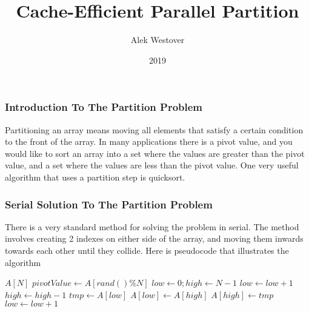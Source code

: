 \documentclass{beamer}
\title{Cache-Efficient Parallel Partition}
\author{Alek Westover}
\institute{MIT PRIMES}
\date{2019}
\begin{document}
 
\frame{\titlepage}
 
\begin{frame}
\frametitle{Introduction To The Partition Problem}
Partitioning an array means moving all elements that satisfy a certain condition to the front of the array. In many applications there is a pivot value, and you would like to sort an array into a set where the values are greater than the pivot value, and a set where the values are less than the pivot value. One very useful algorithm that uses a partition step is quicksort. 
\end{frame}

\begin{frame}
\frametitle{Serial Solution To The Partition Problem}
There is a very standard method for solving the problem in serial. The method involves creating 2 indexes on either side of the array, and moving them inwards towards each other until they collide. Here is pseudocode that illustrates the algorithm
\end{frame}

\begin{frame} 
\begin{algorithmic}
	\State $A[N]$ 
	\State $pivotValue \gets A[rand()\%N]$
	\State $low \gets 0; high  \gets N-1$
			\State $low \gets low+1$
		\EndWhile
			\State $high \gets high-1$
		\EndWhile
		\State $tmp \gets A[low]$
		\State $A[low] \gets A[high]$
		\State $A[high] \gets tmp$
	\EndWhile
		\State $low \gets low+1$
	\EndIf
\end{algorithmic}
\end{frame}
\end{document}

